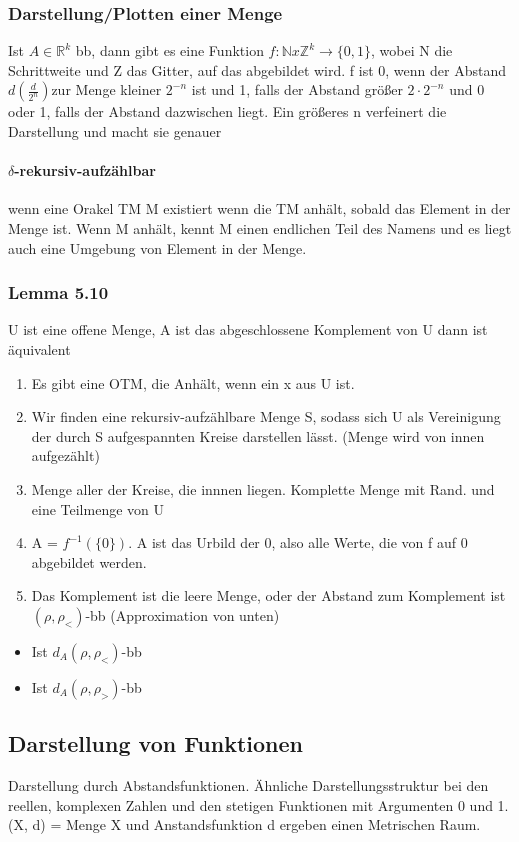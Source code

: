 \documentclass[ngerman]{scrartcl}
\begin{document}
\subsubsection{Darstellung/Plotten einer Menge}
Ist $ A \in \mathbb{R}^k $ bb, dann gibt es eine Funktion $ f : \mathbb{N} x \mathbb{Z}^k \rightarrow \{ 0, 1\}$, wobei N die Schrittweite und Z das Gitter, auf das abgebildet wird. f ist 0, wenn der Abstand $ d(\frac{d}{2^n}) $zur Menge kleiner $ 2^{-n} $ ist und 1, falls der Abstand größer $ 2 \cdot 2^{-n} $ und 0 oder 1, falls der Abstand dazwischen liegt. Ein größeres n verfeinert die Darstellung und macht sie genauer

\paragraph{$ \delta $-rekursiv-aufzählbar}
wenn eine Orakel TM M existiert wenn die TM anhält, sobald das Element in der Menge ist. Wenn M anhält, kennt M einen endlichen Teil des Namens und es liegt auch eine Umgebung von Element in der Menge.

\subsubsection{Lemma 5.10}
U ist eine offene Menge, A ist das abgeschlossene Komplement von U dann ist äquivalent
\begin{enumerate}
  \item Es gibt eine OTM, die Anhält, wenn ein x aus U ist.
  \item Wir finden eine rekursiv-aufzählbare Menge S, sodass sich U als Vereinigung der durch S aufgespannten Kreise darstellen lässt. (Menge wird von innen aufgezählt)
  \item Menge aller der Kreise, die innnen liegen. Komplette Menge mit Rand. und eine Teilmenge von U
  \item A = $ f^{-1}(\{0\}) $. A ist das Urbild der 0, also alle Werte, die von f auf 0 abgebildet werden.
  \item Das Komplement ist die leere Menge, oder der Abstand zum Komplement ist $ (\rho, \rho_<) $-bb (Approximation von unten)
\end{enumerate}
\begin{itemize}
  \item Ist $ d_A (\rho, \rho_<) $-bb
  \item Ist $ d_A (\rho, \rho_>) $-bb
\end{itemize}

\subsection{Darstellung von Funktionen}
Darstellung durch Abstandsfunktionen. Ähnliche Darstellungsstruktur bei den reellen, komplexen Zahlen und den stetigen Funktionen mit Argumenten 0 und 1.
(X, d) = Menge X und Anstandsfunktion d ergeben einen Metrischen Raum.
\end{document}

